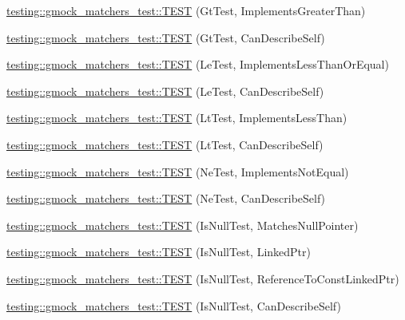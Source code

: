\begin{DoxyCompactItemize}
\mbox{\hyperlink{namespacetesting_1_1gmock__matchers__test_a87a9ac189a12e0b85964f03b3b9998b1}{testing\+::gmock\+\_\+matchers\+\_\+test\+::\+T\+E\+ST}} (Gt\+Test, Implements\+Greater\+Than)
\item 
\mbox{\hyperlink{namespacetesting_1_1gmock__matchers__test_a2981bbdbf9cbd8864a6dde4ff4b06050}{testing\+::gmock\+\_\+matchers\+\_\+test\+::\+T\+E\+ST}} (Gt\+Test, Can\+Describe\+Self)
\item 
\mbox{\hyperlink{namespacetesting_1_1gmock__matchers__test_af0cd1cfc3ff1272bfe06f31c5eb3ab8b}{testing\+::gmock\+\_\+matchers\+\_\+test\+::\+T\+E\+ST}} (Le\+Test, Implements\+Less\+Than\+Or\+Equal)
\item 
\mbox{\hyperlink{namespacetesting_1_1gmock__matchers__test_a463bc4f6cdca489c05ad691e1254e2f3}{testing\+::gmock\+\_\+matchers\+\_\+test\+::\+T\+E\+ST}} (Le\+Test, Can\+Describe\+Self)
\item 
\mbox{\hyperlink{namespacetesting_1_1gmock__matchers__test_a9f332401730e637d5c3923924dc339e3}{testing\+::gmock\+\_\+matchers\+\_\+test\+::\+T\+E\+ST}} (Lt\+Test, Implements\+Less\+Than)
\item 
\mbox{\hyperlink{namespacetesting_1_1gmock__matchers__test_ae29bb32c74970fc22e7ac5d86e7e6c26}{testing\+::gmock\+\_\+matchers\+\_\+test\+::\+T\+E\+ST}} (Lt\+Test, Can\+Describe\+Self)
\item 
\mbox{\hyperlink{namespacetesting_1_1gmock__matchers__test_a7319f919e57cf349f733bbdb56177daf}{testing\+::gmock\+\_\+matchers\+\_\+test\+::\+T\+E\+ST}} (Ne\+Test, Implements\+Not\+Equal)
\item 
\mbox{\hyperlink{namespacetesting_1_1gmock__matchers__test_a8a743510a5256803d75c2d7735ec515a}{testing\+::gmock\+\_\+matchers\+\_\+test\+::\+T\+E\+ST}} (Ne\+Test, Can\+Describe\+Self)
\item 
\mbox{\hyperlink{namespacetesting_1_1gmock__matchers__test_ae1c2971c161e051bf52b86b62c51bb95}{testing\+::gmock\+\_\+matchers\+\_\+test\+::\+T\+E\+ST}} (Is\+Null\+Test, Matches\+Null\+Pointer)
\item 
\mbox{\hyperlink{namespacetesting_1_1gmock__matchers__test_a0b1655e1640b7da6e1e7cc35074d9274}{testing\+::gmock\+\_\+matchers\+\_\+test\+::\+T\+E\+ST}} (Is\+Null\+Test, Linked\+Ptr)
\item 
\mbox{\hyperlink{namespacetesting_1_1gmock__matchers__test_afaaf0776096c0ad62de8236ab1b774d7}{testing\+::gmock\+\_\+matchers\+\_\+test\+::\+T\+E\+ST}} (Is\+Null\+Test, Reference\+To\+Const\+Linked\+Ptr)
\item 
\mbox{\hyperlink{namespacetesting_1_1gmock__matchers__test_a5ba91e0b79fcc0b17b1c1e373e741c38}{testing\+::gmock\+\_\+matchers\+\_\+test\+::\+T\+E\+ST}} (Is\+Null\+Test, Can\+Describe\+Self)

\end{DoxyCompactItemize}
